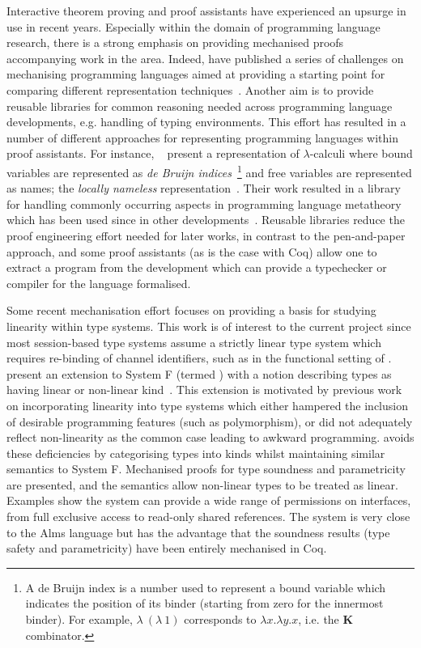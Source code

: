 Interactive theorem proving and proof assistants have experienced an upsurge
in use in recent years. Especially within the domain of programming language
research, there is a strong emphasis on providing mechanised proofs
accompanying work in the area. Indeed, \citeauthor{Aydemir:2005:MMM} have
published a series of challenges on mechanising programming languages aimed at
providing a starting point for comparing different representation
techniques~\cite{Aydemir:2005:MMM}. Another aim is to provide reusable
libraries for common reasoning needed across programming language
developments, e.g. handling of typing environments. This effort has resulted
in a number of different approaches for representing programming languages
within proof assistants. For instance,
\citeauthor{Aydemir:2008:EFM}~\cite{Aydemir:2008:EFM} present a representation
of $\lambda$-calculi where bound variables are represented as \textit{de
  Bruijn indices}~\footnote{A de Bruijn index is a number used to represent a
  bound variable which indicates the position of its binder (starting from
  zero for the innermost binder). For example, $\lambda~(\lambda~1)$
  corresponds to $\lambda x. \lambda y. x$, i.e. the \textbf{K} combinator.}
and free variables are represented as names; the \textit{locally nameless}
representation~\cite{Char:2012}. Their work resulted in a library for handling
commonly occurring aspects in programming language metatheory which has been
used since in other developments~\cite{Park:2014:MMW}. Reusable libraries
reduce the proof engineering effort needed for later works, in contrast to the
pen-and-paper approach, and some proof assistants (as is the case with Coq)
allow one to extract a program from the development which can provide a
typechecker or compiler for the language formalised.

Some recent mechanisation effort focuses on providing a basis for studying
linearity within type systems. This work is of interest to the current project
since most session-based type systems assume a strictly linear type system
which requires re-binding of channel identifiers, such as in the functional
setting of \citeauthor{Gay:2010:LAST}. \citeauthor{Mazurak:2010:LLT} present
an extension to System F (termed \fpop) with a notion describing types as
having linear or non-linear kind~\cite{Mazurak:2010:LLT}. This extension is
motivated by previous work on incorporating linearity into type systems which
either hampered the inclusion of desirable programming features (such as
polymorphism), or did not adequately reflect non-linearity as the common case
leading to awkward programming. \fpop avoids these deficiencies by
categorising types into kinds whilst maintaining similar semantics to System
F. Mechanised proofs for type soundness and parametricity are presented, and
the semantics allow non-linear types to be treated as linear. Examples show
the system can provide a wide range of permissions on interfaces, from full
exclusive access to read-only shared references. The system is very close to
the Alms language but has the advantage that the soundness results (type
safety and parametricity) have been entirely mechanised in Coq.

